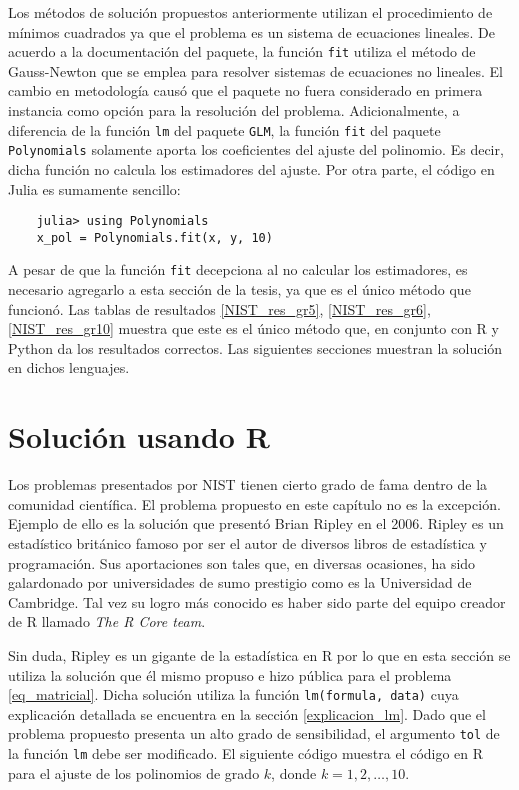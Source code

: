 Los métodos de solución propuestos anteriormente utilizan el procedimiento de mínimos cuadrados ya que el problema es un sistema de ecuaciones lineales. De acuerdo a la documentación del paquete, la función \texttt{fit} utiliza el método de Gauss-Newton que se emplea para resolver sistemas de ecuaciones no lineales. El cambio en metodología causó que el paquete no fuera considerado en primera instancia como opción para la resolución del problema. Adicionalmente, a diferencia de la función \texttt{lm} del paquete \texttt{GLM}, la función \texttt{fit} del paquete \texttt{Polynomials} solamente aporta los coeficientes del ajuste del polinomio. Es decir, dicha función no calcula los estimadores del ajuste. Por otra parte, el código en \textsf{Julia} es sumamente sencillo: 

\begin{verbatim}
	julia> using Polynomials 
	x_pol = Polynomials.fit(x, y, 10)
\end{verbatim}

A pesar de que la función \texttt{fit} decepciona al no calcular los estimadores, es necesario agregarlo a esta  sección de la tesis, ya que es el único método que funcionó. Las tablas de resultados \ref{NIST_res_gr5}, \ref{NIST_res_gr6}, \ref{NIST_res_gr10} muestra que este es el único método que, en conjunto con \textsf{R} y \textsf{Python} da los resultados correctos. Las siguientes secciones muestran la solución en dichos lenguajes. 

\section{Solución usando R}

Los problemas presentados por NIST tienen cierto grado de fama dentro de la comunidad científica. El problema propuesto en este capítulo no es la excepción. Ejemplo de ello es la solución que presentó Brian Ripley en el 2006. Ripley es un estadístico británico famoso por ser el autor de diversos libros de estadística y programación. Sus aportaciones son tales que, en diversas ocasiones, ha sido galardonado por universidades de sumo prestigio como es la Universidad de Cambridge. Tal vez su logro más conocido es haber sido parte del equipo creador de \textsf{R} llamado \textit{The R Core team}. 

Sin duda, Ripley es un gigante de la estadística en \textsf{R} por lo que en esta sección se utiliza la solución que él mismo propuso e hizo pública para el problema \ref{eq_matricial}. Dicha solución utiliza la función \texttt{lm(formula, data)} cuya explicación detallada se encuentra en la sección \ref{explicacion_lm}. Dado que el problema propuesto presenta un alto grado de sensibilidad, el argumento \texttt{tol} de la función \texttt{lm} debe ser modificado. El siguiente código muestra el código en \textsf{R} para el ajuste de los polinomios de grado $k$, donde $k = 1, 2, \dots , 10$.  


